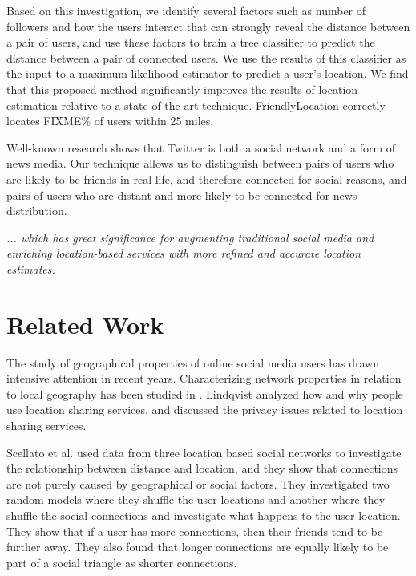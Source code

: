 Based on this investigation, we identify several factors such as number of
followers and how the users interact that can strongly reveal the distance
between a pair of users, and use these factors to train a tree classifier to
predict the distance between a pair of connected users.
%
We use the results of this classifier as the input to a maximum likelihood
estimator to predict a user's location.
%
We find that this proposed method significantly improves the results of
location estimation relative to a state-of-the-art technique.
%
FriendlyLocation correctly locates FIXME\% of users within 25 miles.

Well-known research \cite{kwak2010why} shows that Twitter is both a social
network and a form of news media.
%
Our technique allows us to distinguish between pairs of users who are likely
to be friends in real life, and therefore connected for social reasons, and
pairs of users who are distant and more likely to be connected for news
distribution.

\emph{
... which has great significance for augmenting traditional social media and
enriching location-based services with more refined and accurate location
estimates.
}


\section{Related Work}

The study of geographical properties of online social media users has drawn
intensive attention in recent years.  Characterizing network properties in
relation to local geography has been studied in \cite{yardi2010tweeting}.
Lindqvist \cite{lindqvist2011m} analyzed how and why people use location
sharing services, and discussed the privacy issues related to location sharing
services.

Scellato et al. \cite{scellato2011socio} used data from three location based
social networks to investigate the relationship between distance and location,
and they show that connections are not purely caused by geographical or social
factors.  They investigated two random models where they shuffle the user
locations and another where they shuffle the social connections and investigate
what happens to the user location.  They show that if a user has more
connections, then their friends tend to be further away.  They also found that
longer connections are equally likely to be part of a social triangle as
shorter connections.

